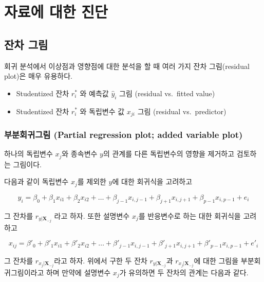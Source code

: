 \documentclass[
]{book}
\begin{document}
\hypertarget{chapter05}{%
\chapter{자료에 대한 진단}\label{chapter05}}

\hypertarget{uxc794uxcc28-uxadf8uxb9bc}{%
\section{잔차 그림}\label{uxc794uxcc28-uxadf8uxb9bc}}

회귀 분석에서 이상점과 영향점에 대한 분석을 할 때 여러 가지 잔차 그림(residual plot)은 매우 유용하다.

\begin{itemize}
\item
  Studentized 잔차 \(r_i^*\) 와 예측값 \(\hat y_i\) 그림 (residual vs.~fitted value)
\item
  Studentized 잔차 \(r_i^*\) 와 독립변수 값 \(x_{ji}\) 그림 (residual vs.~predictor)
\end{itemize}

\hypertarget{uxbd80uxbd84uxd68cuxadc0uxadf8uxb9bc-partial-regression-plot-added-variable-plot}{%
\subsection{부분회귀그림 (Partial regression plot; added variable plot)}\label{uxbd80uxbd84uxd68cuxadc0uxadf8uxb9bc-partial-regression-plot-added-variable-plot}}

하나의 독립변수 \(x_j\)와 종속변수 \(y\)의 관계를 다른 독립변수의 영향을 제거하고 검토하는 그림이다.

다음과 같이 독립변수 \(x_j\)를 제외한 \(y\)에 대한 회귀식을 고려하고

\[ 
y_i=\beta_0 + \beta_1 x_{i1} + \beta_2 x_{i2} + \dots + \beta_{j-1} x_{i,j-1
} +\beta_{j+1} x_{i,j+1}+  \beta_{p-1} x_{i, p-1} + e_i 
\]

그 잔차를 \(r_{y| {\bm X}_{-j}}\) 라고 하자. 또한 설명변수 \(x_j\)를 반응변수로 하는 대한 회귀식을 고려하고

\[
x_{ij}=\beta'_0 + \beta'_1 x_{i1} + \beta'_2 x_{i2} + \dots + \beta'_{j-1} x_{i,j-1} +\beta'_{j+1} x_{i,j+1}+  \beta'_{p-1} x_{i,p-1} + e'_i 
\]

그 잔차를 \(r_{x_j|\bm X_{-j}}\)라고 하자. 위에서 구한 두 잔차 \(r_{y|\bm X_{-j}}\)과 \(r_{x_j|\bm X_{-j}}\)에 대한 그림을 부분회귀그림이라고 하며 만약에 설명변수 \(x_j\)가 유의하면 두 잔차의 관계는 다음과 같다.
\end{document}
